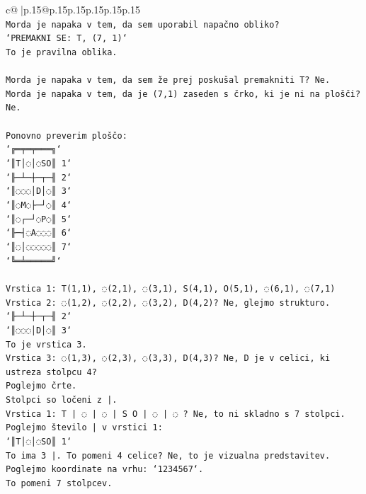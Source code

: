 \documentclass{article}
\begin{document}
{\begin{supertabular}{c@{$\;$}|p{.15\linewidth}@{}p{.15\linewidth}p{.15\linewidth}p{.15\linewidth}p{.15\linewidth}p{.15\linewidth}}
{{{\\ 
\texttt{Morda je napaka v tem, da sem uporabil napačno obliko?} \\
\texttt{`PREMAKNI SE: T, (7, 1)`} \\
\texttt{To je pravilna oblika.} \\
\\ 
\texttt{Morda je napaka v tem, da sem že prej poskušal premakniti T? Ne.} \\
\texttt{Morda je napaka v tem, da je (7,1) zaseden s črko, ki je ni na plošči? Ne.} \\
\\ 
\texttt{Ponovno preverim ploščo:} \\
\texttt{`╔═╤═╤═══╗`} \\
\texttt{`║T│◌│◌SO║ 1`} \\
\texttt{`╟─┴─┼─┬─╢ 2`} \\
\texttt{`║◌◌◌│D│◌║ 3`} \\
\texttt{`║◌M◌├─┘◌║ 4`} \\
\texttt{`║◌┌─┘◌P◌║ 5`} \\
\texttt{`╟─┤◌A◌◌◌║ 6`} \\
\texttt{`║◌│◌◌◌◌◌║ 7`} \\
\texttt{`╚═╧═════╝`} \\
\\ 
\texttt{Vrstica 1: T(1,1), ◌(2,1), ◌(3,1), S(4,1), O(5,1), ◌(6,1), ◌(7,1)} \\
\texttt{Vrstica 2: ◌(1,2), ◌(2,2), ◌(3,2), D(4,2)? Ne, glejmo strukturo.} \\
\texttt{`╟─┴─┼─┬─╢ 2`} \\
\texttt{`║◌◌◌│D│◌║ 3`} \\
\texttt{To je vrstica 3.} \\
\texttt{Vrstica 3: ◌(1,3), ◌(2,3), ◌(3,3), D(4,3)? Ne, D je v celici, ki ustreza stolpcu 4?} \\
\texttt{Poglejmo črte.} \\
\texttt{Stolpci so ločeni z |.} \\
\texttt{Vrstica 1: T | ◌ | ◌ | S O | ◌ | ◌ ? Ne, to ni skladno s 7 stolpci.} \\
\texttt{Poglejmo število | v vrstici 1:} \\
\texttt{`║T│◌│◌SO║ 1`} \\
\texttt{To ima 3 |. To pomeni 4 celice? Ne, to je vizualna predstavitev.} \\
\texttt{Poglejmo koordinate na vrhu: `1234567`.} \\
\texttt{To pomeni 7 stolpcev.} \\
}}}
\end{supertabular}}
\end{document}
